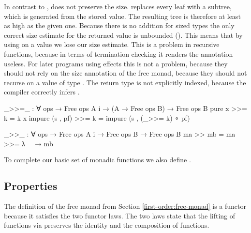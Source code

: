 In contrast to , \AgdaFunction{>>=} does not preserve the
size.
\AgdaFunction{>>=} replaces every  leaf with a
subtree, which is generated from the stored value.
The resulting tree is therefore at least as high as the given one.
Because there is no addition for sized types the only correct size estimate for
the returned value is unbounded ().
This means that by using \AgdaFunction{>>=} on a value we lose our size
estimate.
This is a problem in recursive functions, because in terms of termination
checking it renders the annotation useless.
For later programs using effects this is not a problem, because they should not rely
on the size annotation of the free monad, because they should not recurse on a
value of type .
The return type is not explicitly indexed, because the compiler correctly
infers .

\begin{code}
_>>=_ : ∀ {ops} → Free ops A {i} → (A → Free ops B) → Free ops B
pure x           >>= k = k x
impure (s , pf)  >>= k = impure (s , (_>>= k) ∘ pf)

_>>_ : ∀ {ops} → Free ops A {i} → Free ops B → Free ops B
ma >> mb = ma >>= λ _ → mb
\end{code}
To complete our basic set of monadic functions we also define .


\subsection{Properties}
\label{first-order:free-monad:properties}

The definition of the free monad from Section \ref{first-order:free-monad} is a
functor because it satisfies the two functor laws.
The two laws state that the lifting of functions via 
preserves the identity and the composition of functions.

